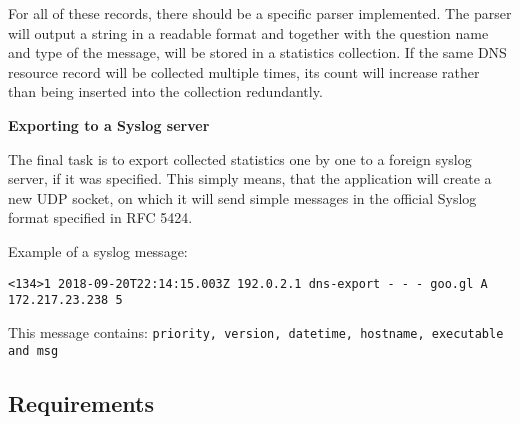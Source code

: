 \vspace{0.5cm}

For all of these records, there should be a specific parser implemented. 
The parser will output a string in a readable format and together 
with the question name and type of the message, will be stored in a statistics collection.
If the same DNS resource record will be collected multiple times, 
its count will increase rather than being inserted into the collection redundantly.

\pagebreak

\textbf{Exporting to a Syslog server}

The final task is to export collected statistics one by one to a foreign syslog server, if it was specified.
This simply means, that the application will create a new UDP socket, on which it will send simple messages 
in the official Syslog format specified in RFC 5424.

Example of a syslog message:

\texttt{<134>1 2018-09-20T22:14:15.003Z 192.0.2.1 dns-export - - - goo.gl A 172.217.23.238 5}

This message contains: \texttt{priority, version, datetime, hostname, executable and msg}

\pagebreak

\subsection{Requirements}

